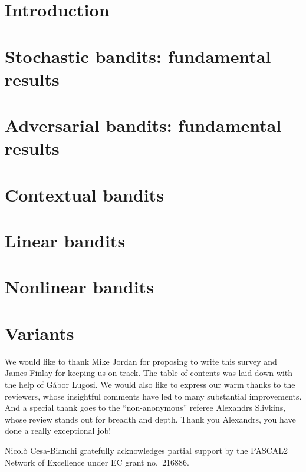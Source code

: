 \documentclass[11pt]{hackednow}
\begin{document}
\chapter{Introduction}
\label{intro}


\chapter{Stochastic bandits: fundamental results}
\label{stochastic}


\chapter{Adversarial bandits: fundamental results}
\label{adversarial}


\chapter{Contextual bandits}
\label{contextual}


\chapter{Linear bandits}
\label{linear}


\chapter{Nonlinear bandits}
\label{nonlinear}


\chapter{Variants}
\label{variants}


%

\begin{acknowledgements}
We would like to thank Mike Jordan for proposing to write this survey and James Finlay for keeping us on track. The table of contents was laid down with the help of G\'abor Lugosi.
We would also like to express our warm thanks to the reviewers, whose insightful comments have led to many substantial improvements. And a special thank goes to the ``non-anonymous'' referee Alexandrs Slivkins, whose review stands out for breadth and depth. Thank you Alexandrs, you have done a really exceptional job!

Nicol\`o Cesa-Bianchi gratefully acknowledges partial support by the PASCAL2 Network of Excellence under EC grant no.\ 216886.
\end{acknowledgements}


%

\end{document}
